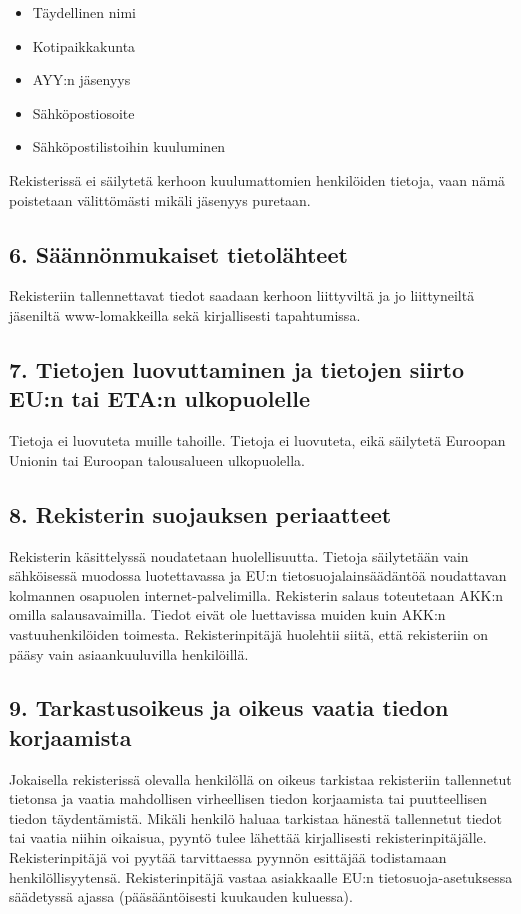 \documentclass[finnish]{tktltiki}
\begin{document}
\begin{itemize}
\item Täydellinen nimi
\item Kotipaikkakunta
\item AYY:n jäsenyys
\item Sähköpostiosoite
\item Sähköpostilistoihin kuuluminen
\end{itemize}
Rekisterissä ei säilytetä kerhoon kuulumattomien henkilöiden tietoja, vaan nämä poistetaan välittömästi mikäli jäsenyys puretaan.

\subsection*{6.	Säännönmukaiset tietolähteet}
Rekisteriin tallennettavat tiedot saadaan kerhoon liittyviltä ja jo liittyneiltä jäseniltä www-lomakkeilla sekä kirjallisesti tapahtumissa.

\subsection*{7.	Tietojen luovuttaminen ja tietojen siirto EU:n tai ETA:n ulkopuolelle}
Tietoja ei luovuteta muille tahoille. Tietoja ei luovuteta, eikä säilytetä Euroopan Unionin tai Euroopan talousalueen ulkopuolella.

\subsection*{8.	Rekisterin suojauksen periaatteet}
Rekisterin käsittelyssä noudatetaan huolellisuutta. Tietoja säilytetään vain sähköisessä muodossa luotettavassa ja EU:n tietosuojalainsäädäntöä noudattavan kolmannen osapuolen internet-palvelimilla. Rekisterin salaus toteutetaan AKK:n omilla salausavaimilla. Tiedot eivät ole luettavissa muiden kuin AKK:n vastuuhenkilöiden toimesta.
Rekisterinpitäjä huolehtii siitä, että rekisteriin on pääsy vain asiaankuuluvilla henkilöillä.

\subsection*{9.	Tarkastusoikeus ja oikeus vaatia tiedon korjaamista }
Jokaisella rekisterissä olevalla henkilöllä on oikeus tarkistaa rekisteriin tallennetut tietonsa ja vaatia mahdollisen virheellisen tiedon korjaamista tai puutteellisen tiedon täydentämistä. Mikäli henkilö haluaa tarkistaa hänestä tallennetut tiedot tai vaatia niihin oikaisua, pyyntö tulee lähettää kirjallisesti rekisterinpitäjälle. Rekisterinpitäjä voi pyytää tarvittaessa pyynnön esittäjää todistamaan henkilöllisyytensä. Rekisterinpitäjä vastaa asiakkaalle EU:n tietosuoja-asetuksessa säädetyssä ajassa (pääsääntöisesti kuukauden kuluessa).
\end{document}
